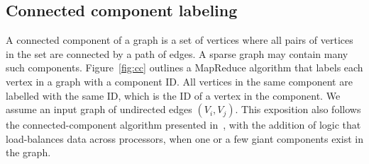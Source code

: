 \subsection{Connected component labeling}

A connected component of a graph is a set of vertices where all pairs
of vertices in the set are connected by a path of edges.  A sparse
graph may contain many such components.  Figure~\ref{fig:cc} outlines
a MapReduce algorithm that labels each vertex in a graph with a
component ID.  All vertices in the same component are labelled with
the same ID, which is the ID of a vertex in the component.  We assume
an input graph of undirected edges $(V_i,V_j)$.  This exposition also
follows the connected-component algorithm presented in~\cite{Cohen09},
with the addition of logic that load-balances data across processors,
when one or a few giant components exist in the graph.

